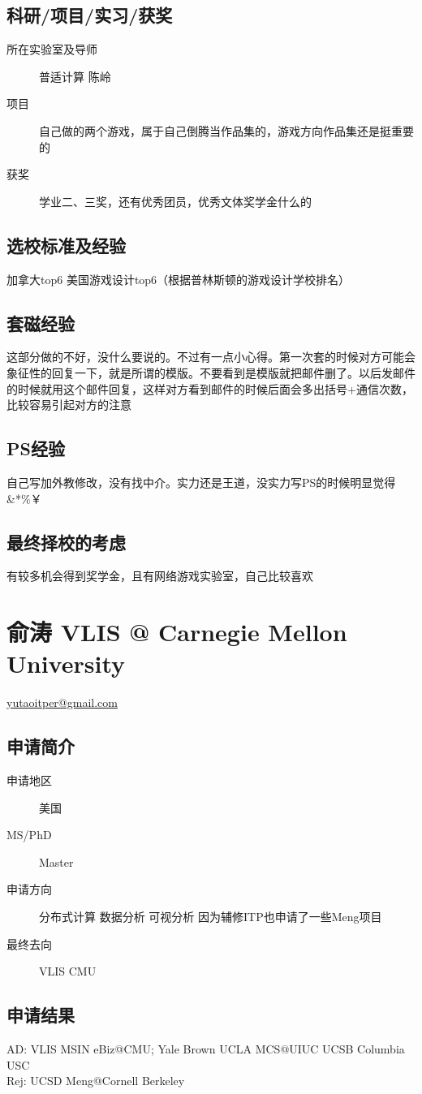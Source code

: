 \documentclass[11pt,fleqn,openany]{book} %
\begin{document}
\subsection*{科研/项目/实习/获奖}
\begin{description}
\item[所在实验室及导师] 普适计算 陈岭
\item[项目] 自己做的两个游戏，属于自己倒腾当作品集的，游戏方向作品集还是挺重要的
\item[获奖] 学业二、三奖，还有优秀团员，优秀文体奖学金什么的
\end{description}
\subsection*{选校标准及经验}
加拿大top6 美国游戏设计top6（根据普林斯顿的游戏设计学校排名）
\subsection*{套磁经验}
这部分做的不好，没什么要说的。不过有一点小心得。第一次套的时候对方可能会象征性的回复一下，就是所谓的模版。不要看到是模版就把邮件删了。以后发邮件的时候就用这个邮件回复，这样对方看到邮件的时候后面会多出括号+通信次数，比较容易引起对方的注意
\subsection*{PS经验}
自己写加外教修改，没有找中介。实力还是王道，没实力写PS的时候明显觉得\&*\%￥
\subsection*{最终择校的考虑}
有较多机会得到奖学金，且有网络游戏实验室，自己比较喜欢
\clearpage
\section{俞涛 VLIS @ Carnegie Mellon University}
\hfill \href{mailto:yutaoitper@gmail.com}{yutaoitper@gmail.com}

\noindent\begin{minipage}[t]{0.45\textwidth}
\subsection*{申请简介}
\begin{description}
\item[申请地区] 美国
\item[MS/PhD] Master
\item[申请方向] 分布式计算 数据分析 可视分析 因为辅修ITP也申请了一些Meng项目
\item[最终去向] VLIS CMU
\end{description}
\end{minipage}
\hfill
\begin{minipage}[t]{0.45\textwidth}
\subsection*{申请结果}
\noindent AD: VLIS MSIN eBiz@CMU; Yale Brown UCLA MCS@UIUC UCSB Columbia USC\\
Rej: UCSD Meng@Cornell Berkeley
\end{minipage}
\end{document}

